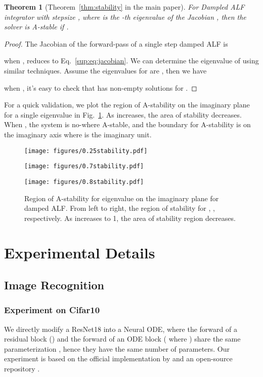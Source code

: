\documentclass{article} \usepackage{iclr2021_conference,times}
\newtheorem{theorem}{Theorem}[section]
\begin{document}
\begin{theorem}[Theorem~\ref{thm:stability} in the main paper]
For Dampled ALF integrator with stepsize , where  is the -th eigenvalue of the Jacobian , then the solver is A-stable if .
\end{theorem}
\begin{proof}
The Jacobian of the forward-pass of a single step damped ALF is

when ,  reduces to Eq.~\ref{sup:eq:jacobian}. We can determine the eigenvalue of  using similar techniques. Assume the eigenvalues for  are , then we have

when , it's easy to check that  has non-empty solutions for .
\end{proof}
For a quick validation, we plot the region of A-stability on the imaginary plane for a single eigenvalue in Fig.~\ref{sup:fig:stability}. As  increases, the area of stability decreases. When , the system is no-where A-stable, and the boundary for A-stability is on the imaginary axis  where  is the imaginary unit. 
\begin{figure}
\begin{minipage}{0.32\textwidth}
\texttt{[image: figures/0.25stability.pdf]}
\end{minipage}
\begin{minipage}{0.32\textwidth}
\texttt{[image: figures/0.7stability.pdf]}
\end{minipage}
\begin{minipage}{0.32\textwidth}
\texttt{[image: figures/0.8stability.pdf]}
\end{minipage}
\caption{Region of A-stability for eigenvalue on the imaginary plane for damped ALF. From left to right, the region of stability for , , respectively. As  increases to 1, the area of stability region decreases.}
\label{sup:fig:stability}
\end{figure}
\newpage
\section{Experimental Details}
\subsection{Image Recognition}
\subsubsection{Experiment on Cifar10}
We directly modify a ResNet18 into a Neural ODE, where the forward of a residual block () and the forward of an ODE block ( where ) share the same parameterization , hence they have the same number of parameters. Our experiment is based on the official implementation by \citet{zhuang2020adaptive} and an open-source repository \citep{cifar10}.
\end{document}

